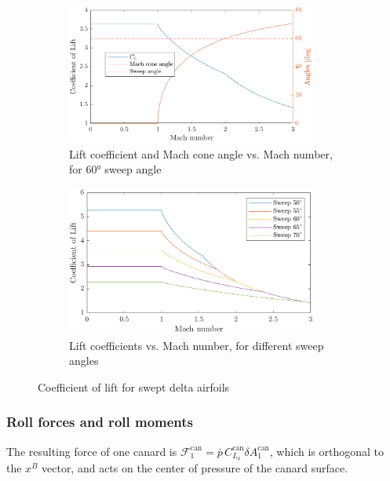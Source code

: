 \begin{figure}[ht]
    \centering
    \begin{subfigure}{0.49\textwidth}
        \includegraphics[width=0.9\textwidth]{images-design/airfoil_angles.png}
        \caption{Lift coefficient and Mach cone angle vs. Mach number, for 60° sweep angle}
        \label{fig:airfoil-angles}
    \end{subfigure}
    \begin{subfigure}{0.49\textwidth}
        \includegraphics[width=0.9\textwidth]{images-design/airfoil_sweeps.png}
        \caption{Lift coefficients vs. Mach number, for different sweep angles}
        \label{fig:airfoil-sweeps}
    \end{subfigure}
    \caption[Swept delta airfoil theory]{Coefficient of lift for swept delta airfoils}
    \label{fig:airfoil}
\end{figure}


\subsubsection{Roll forces and roll moments}
The resulting force of one canard is $\mathcal{F}^\text{can}_1 = \bar p \, C^\text{can}_{L_\delta} \delta A^\text{can}_1$, which is orthogonal to the $x^B$ vector, and acts on the center of pressure of the canard surface.


